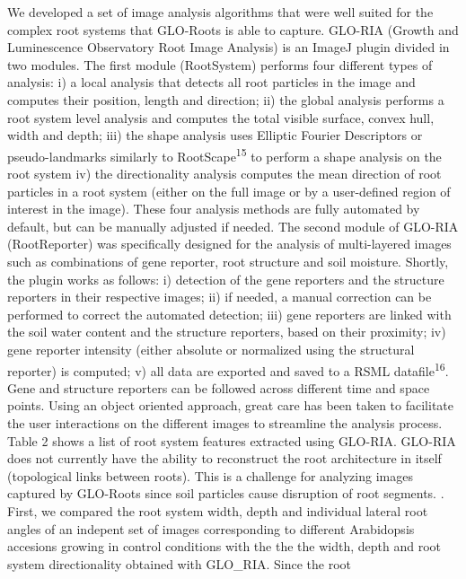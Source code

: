 \documentclass[]{article}
\begin{document}
We developed a set of image analysis algorithms that were well suited
for the complex root systems that GLO-Roots is able to capture. GLO-RIA
(Growth and Luminescence Observatory Root Image Analysis) is an ImageJ
plugin divided in two modules. The first module (RootSystem) performs
four different types of analysis: i) a local analysis that detects all
root particles in the image and computes their position, length and
direction; ii) the global analysis performs a root system level analysis
and computes the total visible surface, convex hull, width and depth;
iii) the shape analysis uses Elliptic Fourier Descriptors or
pseudo-landmarks similarly to RootScape\textsuperscript{15} to perform a
shape analysis on the root system iv) the directionality analysis
computes the mean direction of root particles in a root system (either
on the full image or by a user-defined region of interest in the image).
These four analysis methods are fully automated by default, but can be
manually adjusted if needed. The second module of GLO-RIA (RootReporter)
was specifically designed for the analysis of multi-layered images such
as combinations of gene reporter, root structure and soil moisture.
Shortly, the plugin works as follows: i) detection of the gene reporters
and the structure reporters in their respective images; ii) if needed, a
manual correction can be performed to correct the automated detection;
iii) gene reporters are linked with the soil water content and the
structure reporters, based on their proximity; iv) gene reporter
intensity (either absolute or normalized using the structural reporter)
is computed; v) all data are exported and saved to a RSML
datafile\textsuperscript{16}. Gene and structure reporters can be
followed across different time and space points. Using an object
oriented approach, great care has been taken to facilitate the user
interactions on the different images to streamline the analysis process.
Table 2 shows a list of root system features extracted using GLO-RIA.
GLO-RIA does not currently have the ability to reconstruct the root
architecture in itself (topological links between roots). This is a
challenge for analyzing images captured by GLO-Roots since soil
particles cause disruption of root segments. \color{blue}{We validated the
measurements obtained with GLO-RIA using two approaches}. First, we
compared the root system width, depth and individual lateral root angles
of an indepent set of images corresponding to different Arabidopsis
accesions growing in control conditions with the the the width, depth
and root system directionality obtained with GLO\_RIA. Since the root
\end{document}
